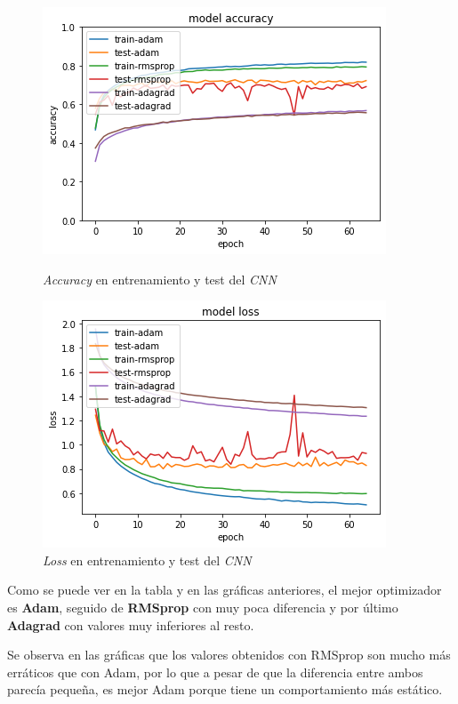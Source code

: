 \documentclass{uc3mpracticas}
\begin{document}
\begin{figure}[!h]
\centering
\begin{minipage}{.52\textwidth}
  \centering
  \includegraphics[width=.8\linewidth]{Images/accuracyCNN.png}
  \caption*{\textit{Accuracy} en entrenamiento y test del \textit{CNN}}
\end{minipage}%
\begin{minipage}{.52\textwidth}
  \centering
  \includegraphics[width=.8\linewidth]{Images/lossCNN.png}
  \caption*{\textit{Loss} en entrenamiento y test del \textit{CNN}}
\end{minipage}
\end{figure}



Como se puede ver en la tabla y en las gráficas anteriores, el mejor optimizador es \textbf{Adam}, seguido de \textbf{RMSprop} con muy poca diferencia y por último \textbf{Adagrad} con valores muy inferiores al resto.

\vspace{2mm}

Se observa en las gráficas que los valores obtenidos con RMSprop son mucho más erráticos que con Adam, por lo que a pesar de que la diferencia entre ambos parecía pequeña, es mejor Adam porque tiene un comportamiento más estático.
\end{document}

